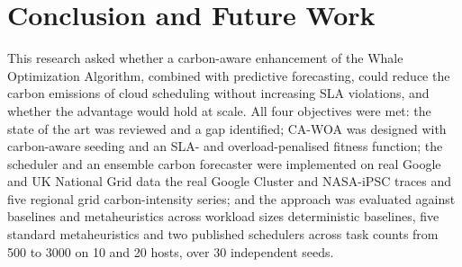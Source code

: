 \documentclass[12pt,a4paper]{article}
\providecommand{\DIFaddtex}[1]{{\protect\color{blue} \sf #1}} %
\providecommand{\DIFdeltex}[1]{{\protect\color{red} \scriptsize #1}} %
\providecommand{\DIFaddbegin}{} %
\providecommand{\DIFaddend}{} %
\providecommand{\DIFdelbegin}{} %
\providecommand{\DIFdelend}{} %
\providecommand{\DIFadd}[1]{\texorpdfstring{\DIFaddtex{#1}}{#1}} %
\providecommand{\DIFdel}[1]{\texorpdfstring{\DIFdeltex{#1}}{}} %
\providecommand{\DIFscaledelfig}{0.5}
\newlength{\DIFdelgraphicswidth} %
\newlength{\DIFdelgraphicsheight} %
\providecommand{\DIFaddincludegraphics}[2][]{{\color{blue}\fbox{\DIFOincludegraphics[#1]{#2}}}} %
\providecommand{\DIFdelincludegraphics}[2][]{%
\sbox{\DIFdelgraphicsbox}{\DIFOincludegraphics[#1]{#2}}%
\settoboxwidth{\DIFdelgraphicswidth}{\DIFdelgraphicsbox} %
\settoboxtotalheight{\DIFdelgraphicsheight}{\DIFdelgraphicsbox} %
\scalebox{\DIFscaledelfig}{%
\parbox[b]{\DIFdelgraphicswidth}{\usebox{\DIFdelgraphicsbox}\\[-\baselineskip] \rule{\DIFdelgraphicswidth}{0em}}\llap{\resizebox{\DIFdelgraphicswidth}{\DIFdelgraphicsheight}{%
\setlength{\unitlength}{\DIFdelgraphicswidth}%
\begin{picture}(1,1)%
\thicklines\linethickness{2pt} %
{\color[rgb]{1,0,0}\put(0,0){\framebox(1,1){}}}%
{\color[rgb]{1,0,0}\put(0,0){\line( 1,1){1}}}%
{\color[rgb]{1,0,0}\put(0,1){\line(1,-1){1}}}%
\end{picture}%
}\hspace*{3pt}}} %
} %
\DeclareRobustCommand{\DIFaddbegin}{\DIFOaddbegin \let\includegraphics\DIFaddincludegraphics} %
\DeclareRobustCommand{\DIFaddend}{\DIFOaddend \let\includegraphics\DIFOincludegraphics} %
\DeclareRobustCommand{\DIFdelbegin}{\DIFOdelbegin \let\includegraphics\DIFdelincludegraphics} %
\DeclareRobustCommand{\DIFdelend}{\DIFOaddend \let\includegraphics\DIFOincludegraphics} %
\begin{document}
\section{Conclusion and Future Work}\label{sec:conc}
This research asked whether a carbon-aware enhancement of the Whale Optimization Algorithm, combined with
predictive forecasting, could reduce the carbon emissions of cloud scheduling without increasing SLA
violations, and whether the advantage would hold at scale. All four objectives were met: the state of the art
was reviewed and a gap identified; CA-WOA was designed with carbon-aware seeding and an SLA- and
overload-penalised fitness function; the scheduler and an ensemble carbon forecaster were implemented on \DIFdelbegin \DIFdel{real
Google and UK National Grid data}\DIFdelend \DIFaddbegin \DIFadd{the
real Google Cluster and NASA-iPSC traces and five regional grid carbon-intensity series}\DIFaddend ; and the approach was
evaluated against \DIFdelbegin \DIFdel{baselines and metaheuristics across
workload sizes}\DIFdelend \DIFaddbegin \DIFadd{deterministic baselines, five standard metaheuristics and two published schedulers across
task counts from 500 to 3000 on 10 and 20 hosts, over 30 independent seeds}\DIFaddend .
\end{document}
